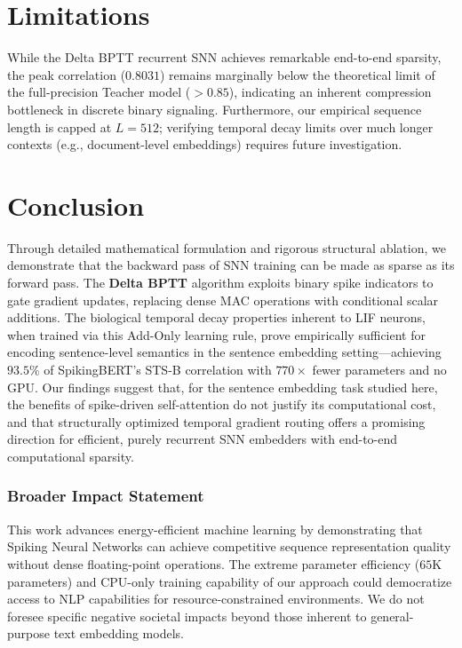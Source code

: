 \documentclass[10pt,a4paper,twoside]{article}
\begin{document}
\section{Limitations}
While the Delta BPTT recurrent SNN achieves remarkable end-to-end sparsity, the peak correlation ($0.8031$) remains marginally below the theoretical limit of the full-precision Teacher model ($>0.85$), indicating an inherent compression bottleneck in discrete binary signaling. Furthermore, our empirical sequence length is capped at $L=512$; verifying temporal decay limits over much longer contexts (e.g., document-level embeddings) requires future investigation.

\section{Conclusion}
Through detailed mathematical formulation and rigorous structural ablation, we demonstrate that the backward pass of SNN training can be made as sparse as its forward pass. The \textbf{Delta BPTT} algorithm exploits binary spike indicators to gate gradient updates, replacing dense MAC operations with conditional scalar additions. The biological temporal decay properties inherent to LIF neurons, when trained via this Add-Only learning rule, prove empirically sufficient for encoding sentence-level semantics in the sentence embedding setting---achieving $93.5\%$ of SpikingBERT's STS-B correlation with $770\times$ fewer parameters and no GPU. Our findings suggest that, for the sentence embedding task studied here, the benefits of spike-driven self-attention do not justify its computational cost, and that structurally optimized temporal gradient routing offers a promising direction for efficient, purely recurrent SNN embedders with end-to-end computational sparsity.

\subsubsection*{Broader Impact Statement}
This work advances energy-efficient machine learning by demonstrating that Spiking Neural Networks can achieve competitive sequence representation quality without dense floating-point operations. The extreme parameter efficiency ($65$K parameters) and CPU-only training capability of our approach could democratize access to NLP capabilities for resource-constrained environments. We do not foresee specific negative societal impacts beyond those inherent to general-purpose text embedding models.
\end{document}
